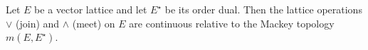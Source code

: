Let $E$ be a vector lattice and let $E^\star$ be its order dual. Then the lattice operations $\vee$ (join) and $\wedge$ (meet) on $E$ are continuous relative to the Mackey topology $m(E, E^\star)$.
